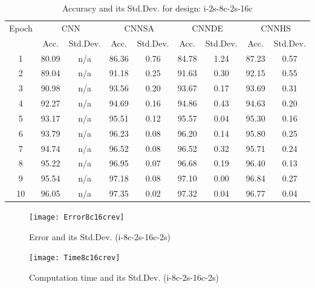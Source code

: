 \documentclass[10pt,letterpaper]{article}
\begin{document}
\begin{table}[]
\small
\caption{Accuracy and its Std.Dev. for design: i-2s-8c-2s-16c}
\label{tab:my_label}

\begin{tabular}{c c c c c c c c c}
\hline
\multicolumn{1}{c}{\multirow{2}{*}{Epoch}} & \multicolumn{2}{c}{CNN} &
\multicolumn{2}{c}{CNNSA} & \multicolumn{2}{c}{CNNDE} & \multicolumn{2}{c}{CNNHS}\\
\cline{2-9}

\multicolumn{1}{r}{}       & \multicolumn{1}{c}{Acc.} & \multicolumn{1}{c}{Std.Dev.} &
\multicolumn{1}{c}{Acc.} & \multicolumn{1}{c}{Std.Dev.}  & \multicolumn{1}{c}{Acc.} &
\multicolumn{1}{c}{Std.Dev.} & \multicolumn{1}{c}{Acc.} & \multicolumn{1}{c}{Std.Dev.} \\
\hline

1		& 80.09 & n/a	 & 86.36 & 0.76	  & 84.78 & 1.24    & 87.23  & 0.57  \\
2 		& 89.04 & n/a	 & 91.18 & 0.25	  & 91.63 & 0.30    & 92.15  & 0.55  \\
3		& 90.98 & n/a	 & 93.56 & 0.20	  & 93.67 & 0.17  	& 93.69  & 0.31  \\
4		& 92.27 & n/a	 & 94.69 & 0.16	  & 94.86 & 0.43 	& 94.63  & 0.20  \\
5		& 93.17	& n/a    & 95.51 & 0.12	  & 95.57 & 0.04    & 95.30  & 0.16 \\
6		& 93.79 & n/a	 & 96.23 & 0.08   & 96.20 & 0.14  	& 95.80  & 0.25 \\
7 		& 94.74	& n/a    & 96.52 & 0.08   & 96.52 & 0.32    & 95.71  & 0.24 \\
8		& 95.22 & n/a	 & 96.95 & 0.07	  & 96.68 & 0.19 	& 96.40  & 0.13 \\
9		& 95.54 & n/a	 & 97.18 & 0.08   & 97.10 & 0.00 	& 96.84  & 0.27 \\
10		& 96.05 & n/a	 & 97.35 & 0.02	  & 97.32 & 0.04	& 96.77  & 0.04 \\

\hline
\end{tabular}
\end{table}



\begin{figure}
    \texttt{[image: Error8c16crev]}
    \caption{Error and its Std.Dev. (i-8c-2s-16c-2s) }
    \label{fig:my_label}
\end{figure}



\begin{figure}
\texttt{[image: Time8c16crev]}
\caption{Computation time and its Std.Dev. (i-8c-2s-16c-2s)}
\label{fig:my_label}
\end{figure}
\end{document}
